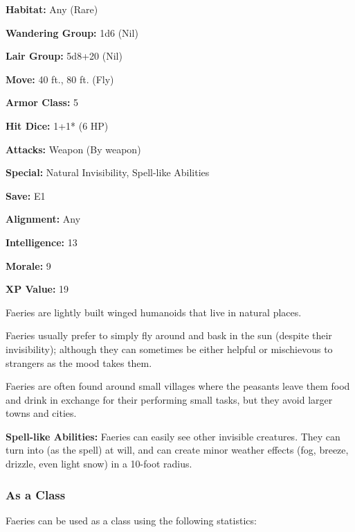 \begin{multicols*}{2}
{\textbf{Habitat:} Any (Rare)

\textbf{Wandering Group:} 1d6 (Nil)

\textbf{Lair Group:} 5d8+20 (Nil)

\textbf{Move:} 40 ft., 80 ft. (Fly)

\textbf{Armor Class:} 5

\textbf{Hit Dice:} 1+1* (6 HP)

\textbf{Attacks:} Weapon (By weapon)

\textbf{Special:} Natural Invisibility, Spell-like Abilities

\textbf{Save:} E1

\textbf{Alignment:} Any

\textbf{Intelligence:} 13

\textbf{Morale:} 9

\textbf{XP Value:} 19}

Faeries are lightly built winged humanoids that live in natural places.

Faeries usually prefer to simply fly around and bask in the sun (despite their invisibility); although they can sometimes be either helpful or mischievous to strangers as the mood takes them.

Faeries are often found around small villages where the peasants leave them food and drink in exchange for their performing small tasks, but they avoid larger towns and cities.

\textbf{Spell-like Abilities:} Faeries can easily see other invisible creatures. They can turn into  (as the spell) at will, and can create minor weather effects (fog, breeze, drizzle, even light snow) in a 10-foot radius.

\subsubsection{As a Class}
Faeries can be used as a class using the following statistics:

\end{multicols*}
